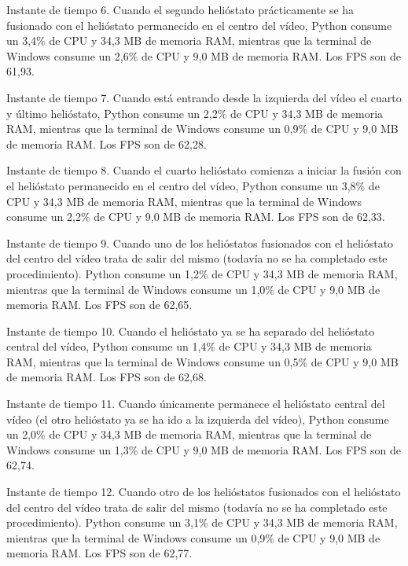 \documentclass[12pt]{article}
\begin{document}
Instante de tiempo 6. Cuando el segundo helióstato prácticamente se ha fusionado con el helióstato permanecido en el centro del vídeo, Python consume un 3,4\% de CPU y 34,3 MB de memoria RAM, mientras que la terminal de Windows consume un 2,6\% de CPU y 9,0 MB de memoria RAM. Los FPS son de 61,93.




Instante de tiempo 7. Cuando está entrando desde la izquierda del vídeo el cuarto y último helióstato, Python consume un 2,2\% de CPU y 34,3 MB de memoria RAM, mientras que la terminal de Windows consume un 0,9\% de CPU y 9,0 MB de memoria RAM. Los FPS son de 62,28.




Instante de tiempo 8. Cuando el cuarto helióstato comienza a iniciar la fusión con el helióstato permanecido en el centro del vídeo, Python consume un 3,8\% de CPU y 34,3 MB de memoria RAM, mientras que la terminal de Windows consume un 2,2\% de CPU y 9,0 MB de memoria RAM. Los FPS son de 62,33.




Instante de tiempo 9. Cuando uno de los helióstatos fusionados con el helióstato del centro del vídeo trata de salir del mismo (todavía no se ha completado este procedimiento). Python consume un 1,2\% de CPU y 34,3 MB de memoria RAM, mientras que la terminal de Windows consume un 1,0\% de CPU y 9,0 MB de memoria RAM. Los FPS son de 62,65.




Instante de tiempo 10. Cuando el helióstato ya se ha separado del helióstato central del vídeo, Python consume un 1,4\% de CPU y 34,3 MB de memoria RAM, mientras que la terminal de Windows consume un 0,5\% de CPU y 9,0 MB de memoria RAM. Los FPS son de 62,68.




Instante de tiempo 11. Cuando únicamente permanece el helióstato central del vídeo (el otro helióstato ya se ha ido a la izquierda del vídeo), Python consume un 2,0\% de CPU y 34,3 MB de memoria RAM, mientras que la terminal de Windows consume un 1,3\% de CPU y 9,0 MB de memoria RAM. Los FPS son de 62,74.




Instante de tiempo 12. Cuando otro de los helióstatos fusionados con el helióstato del centro del vídeo trata de salir del mismo (todavía no se ha completado este procedimiento). Python consume un 3,1\% de CPU y 34,3 MB de memoria RAM, mientras que la terminal de Windows consume un 0,9\% de CPU y 9,0 MB de memoria RAM. Los FPS son de 62,77.
\end{document}

